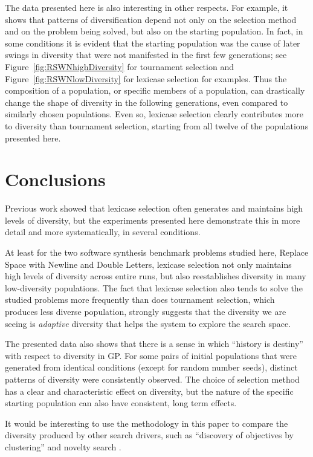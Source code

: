 \documentclass{sig-alternate-05-2015}
\begin{document}
The data presented here is also interesting in other respects. For example, it shows that patterns of diversification depend not only on the selection method and on the problem being solved, but also on the starting population. In fact, in some conditions it is evident that the starting population was the cause of later swings in diversity that were not manifested in the first few generations; see Figure~\ref{fig:RSWNhighDiversity} for tournament selection and Figure~\ref{fig:RSWNlowDiversity} for lexicase selection for examples. Thus the composition of a population, or specific members of a population, can drastically change the shape of diversity in the following generations, even compared to similarly chosen populations. Even so, lexicase selection clearly contributes more to diversity than tournament selection, starting from all twelve of the populations presented here.


\section{Conclusions}
\label{sec:conclusions}

Previous work showed that lexicase selection often generates and maintains high levels of diversity, but the experiments presented here demonstrate this in more detail and more systematically, in several conditions.

At least for the two software synthesis benchmark problems studied here, Replace Space with Newline and Double Letters, lexicase selection not only maintains high levels of diversity across entire runs, but also reestablishes diversity in many low-diversity populations. The fact that lexicase selection also tends to solve the studied problems more frequently than does tournament selection, which produces less diverse population, strongly suggests that the diversity we are seeing is {\it adaptive} diversity that helps the system to explore the search space.

The presented data also shows that there is a sense in which ``history is destiny'' with respect to diversity in GP. For some pairs of initial populations that were generated from identical conditions (except for random number seeds), distinct patterns of diversity were consistently observed. The choice of selection method has a clear and characteristic effect on diversity, but the nature of the specific starting population can also have consistent, long term effects.

It would be interesting to use the methodology in this paper to compare the diversity produced by other search drivers, such as ``discovery of objectives by clustering'' \cite{Krawiec:2015:EuroGP} and novelty search \cite{Lehman:2011:EDV:2001576.2001606}.
\end{document}
